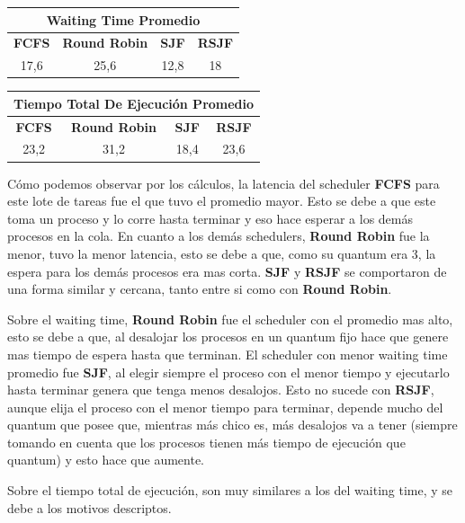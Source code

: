 \begin{center}
	\begin{tabular}{|c|c|c|c|}
		\hline
		\multicolumn{4}{|c|}{\large{\textbf{Waiting Time Promedio}}} \\
		\hline
		\textbf{FCFS} & \textbf{Round Robin} & \textbf{SJF} & \textbf{RSJF} \\
		\hline
		17,6 & 25,6 & 12,8 & 18 \\
		\hline
	\end{tabular}
\end{center}

\begin{center}
	\begin{tabular}{|c|c|c|c|}
		\hline
		\multicolumn{4}{|c|}{\large{\textbf{Tiempo Total De Ejecución Promedio}}} \\
		\hline
		\textbf{FCFS} & \textbf{Round Robin} & \textbf{SJF} & \textbf{RSJF} \\
		\hline
		23,2 & 31,2 & 18,4 & 23,6 \\
		\hline
	\end{tabular}
\end{center}

Cómo podemos observar por los cálculos, la latencia del scheduler \textbf{FCFS} para este lote de tareas fue el que tuvo el promedio mayor. Esto se debe a que este toma un proceso y lo corre hasta terminar y eso hace esperar a los demás procesos en la cola. En cuanto a los demás schedulers, \textbf{Round Robin} fue la menor, tuvo la menor latencia, esto se debe a que, como su quantum era 3, la espera para los demás procesos era mas corta. \textbf{SJF} y \textbf{RSJF} se comportaron de una forma similar y cercana, tanto entre si como con \textbf{Round Robin}.

Sobre el waiting time, \textbf{Round Robin} fue el scheduler con el promedio mas alto, esto se debe a que, al desalojar los procesos en un quantum fijo hace que genere mas tiempo de espera hasta que terminan. El scheduler con menor waiting time promedio fue \textbf{SJF}, al elegir siempre el proceso con el menor tiempo y ejecutarlo hasta terminar genera que tenga menos desalojos. Esto no sucede con \textbf{RSJF}, aunque elija el proceso con el menor tiempo para terminar, depende mucho del quantum que posee que, mientras más chico es, más desalojos va a tener (siempre tomando en cuenta que los procesos tienen más tiempo de ejecución que quantum) y esto hace que aumente.

Sobre el tiempo total de ejecución, son muy similares a los del waiting time, y se debe a los motivos descriptos.

